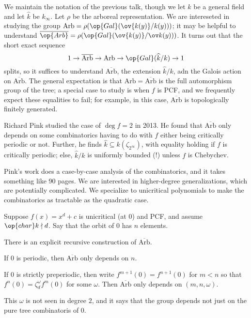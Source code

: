 \documentclass{article}
\begin{document}
We maintain the notation of the previous talk, though we let $k$ be a general field and let $\widehat k$ be $k_\infty$. Let $\rho$ be the arboreal representation. We are intereseted in studying the group $\mathrm{Arb}=\rho(\op{Gal}(\ov {k(y)}/k(y)))$; it may be helpful to understand $\overline{\op{Arb}}=\rho(\op{Gal}(\ov{k(y)}/\ov k(y)))$. It turns out that the short exact sequence
\[1\to\overline{\mathrm{Arb}}\to\mathrm{Arb}\to\op{Gal}(\widehat k/k)\to1\]
splits, so it suffices to understand $\overline{\mathrm{Arb}}$, the extension $\widehat k/k$, adn the Galois action on $\overline{\mathrm{Arb}}$. The general expectation is that $\mathrm{Arb}=\overline{\mathrm{Arb}}$ is the full automorphism group of the tree; a special case to study is when $f$ is PCF, and we frequently expect these equalities to fail; for example, in this case, $\overline{\mathrm{Arb}}$ is topologically finitely generated.
\begin{remark}
	Richard Pink studied the case of $\deg f=2$ in 2013. He found that $\overline{\mathrm{Arb}}$ only depends on some combinatorics having to do with $f$ either being critically periodic or not. Further, he finds $\widehat k\subseteq k(\zeta_{2^\infty})$, with equality holding if $f$ is critically periodic; else, $\widehat k/k$ is uniformly bounded (!) unless $f$ is Chebychev.
\end{remark}
Pink's work does a case-by-case analysis of the combinatorics, and it takes something like 90 pages. We are interested in higher-degree generalizations, which are potentially complicated. We specialize to unicritical polynomials to make the combinatorics as tractable as the quadratic case.
\begin{theorem}
	Suppose $f(x)=x^d+c$ is unicritical (at $0$) and PCF, and assume $\op{char}k\nmid d$. Say that the orbit of $0$ has $n$ elements.
	\begin{listalph}
		\item There is an explicit recursive construction of $\overline{\mathrm{Arb}}$.
		\item If $0$ is periodic, then $\overline{\mathrm{Arb}}$ only depends on $n$.
		\item If $0$ is strictly preperiodic, then write $f^{m+1}(0)=f^{n+1}(0)$ for $m<n$ so that $f^n(0)=\zeta_d^\omega f^m(0)$ for some $\omega$. Then $\overline{\mathrm{Arb}}$ only depends on $(m,n,\omega)$.
	\end{listalph}
\end{theorem}
This $\omega$ is not seen in degree $2$, and it says that the group depends not just on the pure tree combinatoris of $0$.
\end{document}
